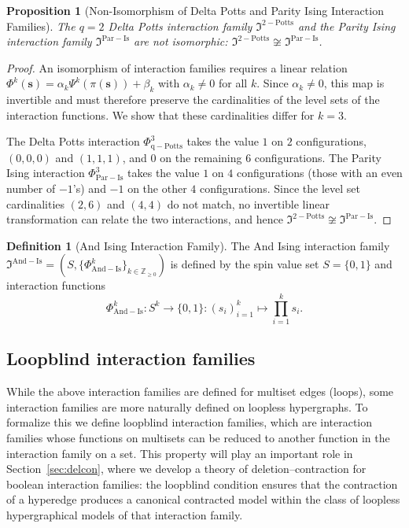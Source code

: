\documentclass[11pt,reqno]{amsart}
\newcommand{\vecs}{\boldsymbol{s}}
\newcommand{\mci}{\mathfrak{I}^{\mathrm{Par-Is}}}
\newcommand{\mcpt}{\mathfrak{I}^{2-\mathrm{Potts}}}
\newcommand{\mca}{\mathfrak{I}^{\mathrm{And-Is}}}
\newcommand{\sset}{spin value set }
\newcommand{\PhiIs}{\Phi_{\mathrm{Par-Is}}}
\newcommand{\PhiPotts}{\Phi_{\mathrm{q-Potts}}}
\newcommand{\PhiAnd}{\Phi_{\mathrm{And-Is}}}
\theoremstyle{plain}
\newtheorem{proposition}[theorem]{Proposition}
\theoremstyle{definition}
\newtheorem{definition}[theorem]{Definition}
\numberwithin{equation}{section}
\begin{document}
\begin{proposition}[Non-Isomorphism of Delta Potts and Parity Ising Interaction Families]
\label{prop:potts_parity_noniso}
The $q=2$ Delta Potts interaction family $\mcpt$ and the Parity Ising interaction family $\mci$ are not isomorphic: $\mcpt \not\cong \mci$.
\end{proposition}

\begin{proof}
An isomorphism of interaction families requires a linear relation $\Phi^k(\vecs) = \alpha_k \Psi^k(\pi(\vecs)) + \beta_k$ with $\alpha_k \neq 0$ for all $k$. Since $\alpha_k \neq 0$, this map is invertible and must therefore preserve the cardinalities of the level sets of the interaction functions. We show that these cardinalities differ for $k = 3$.

The Delta Potts interaction $\PhiPotts^3$ takes the value $1$ on $2$ configurations, $(0,0,0)$ and $(1,1,1)$, and $0$ on the remaining $6$ configurations. The Parity Ising interaction $\PhiIs^3$ takes the value $1$ on $4$ configurations (those with an even number of $-1$'s) and $-1$ on the other $4$ configurations. Since the level set cardinalities $(2, 6)$ and $(4, 4)$ do not match, no invertible linear transformation can relate the two interactions, and hence $\mcpt \not\cong \mci$.
\end{proof}

\begin{definition}[And Ising Interaction Family]
    The And Ising interaction family $\mca = (S, \{\PhiAnd^k\}_{k \in \mathbb{Z}_{\geq 0}})$ is defined by the \sset $S = \{0,1\}$ and interaction functions
    \[
    \PhiAnd^k \colon S^k \to \{0,1\} \colon (s_i)_{i=1}^k \mapsto \prod_{i=1}^k s_i.
    \]
\end{definition}

\subsection{Loopblind interaction families}

While the above interaction families are defined for multiset edges (loops), some interaction families are more naturally defined on loopless hypergraphs. To formalize this we define loopblind interaction families, which are interaction families whose functions on multisets can be reduced to another function in the interaction family on a set. This property will play an important role in Section~\ref{sec:delcon}, where we develop a theory of deletion--contraction for boolean interaction families: the loopblind condition ensures that the contraction of a hyperedge produces a canonical contracted model within the class of loopless hypergraphical models of that interaction family.
\end{document}
